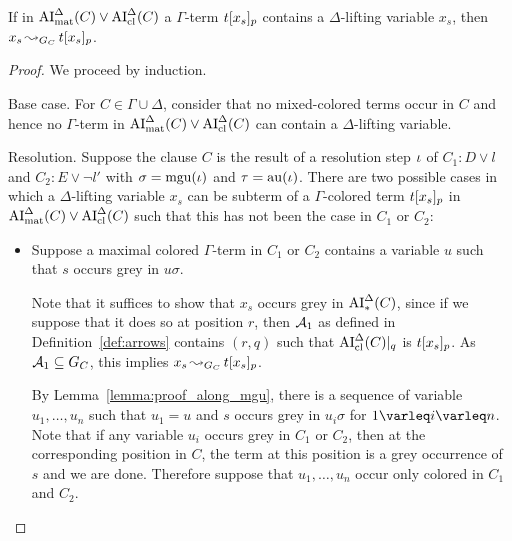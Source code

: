\documentclass[,%
	draft=false,%
	numbers=noendperiod
	11pt,
	a4paper,
	oneside,%
	openany,
]{memoir}
\begin{document}
\begin{lemma}
	If in $\operatorname{AI}_\mathrm{mat}^\Delta(C) \lor \operatorname{AI}_\mathrm{cl}^\Delta(C)$ a
	$\Gamma$-term $t{[x_s]_{p}}$ contains a $\Delta$-lifting variable $x_s$, then $x_s \operatorname{\leadsto}_{G_C} t{[x_s]_{p}}$.
\end{lemma}
\begin{proof}
	We proceed by induction.

	\begin{description}
		\item{}Base case.
			For $C \in \Gamma\cup\Delta$, consider that no mixed-colored terms occur in $C$ and hence no $\Gamma$-term in $\operatorname{AI}_\mathrm{mat}^\Delta(C) \lor \operatorname{AI}_\mathrm{cl}^\Delta(C)$ can contain a $\Delta$-lifting variable.

		\item{}Resolution.
			Suppose the clause $C$ is the result of a resolution step $\iota$ of $C_1: D \lor l$ and $C_2: E \lor \lnot l'$ with $\sigma = \operatorname{mgu}(\iota)$ and $\tau = \operatorname{au}(\iota)$.
			There are two possible cases in which a $\Delta$-lifting variable $x_s$ can be subterm of a $\Gamma$-colored term $t{[x_s]_{p}}$ in $\operatorname{AI}_\mathrm{mat}^\Delta(C)\lor \operatorname{AI}_\mathrm{cl}^\Delta(C)$ such that this has not been the case in $C_1$ or $C_2$:

			\begin{itemize}

				\item Suppose a maximal colored $\Gamma$-term in $C_1$ or $C_2$ contains a variable $u$ such that $s$ occurs grey in $u\sigma$. 

					Note that it suffices to show that $x_s$ occurs grey in $\operatorname{AI}_\mathrm{*}^\Delta(C)$,
					since if we suppose that it does so at position $r$,
					then $\operatorname{\mathcal{A}}_1$ as defined in Definition~\ref{def:arrows} contains $(r, q)$ such that $\operatorname{AI}_\mathrm{cl}^\Delta(C)|_{q}$ is $t{[x_s]_{p}}$.
					As $\operatorname{\mathcal{A}}_1 \subseteq G_C$, this implies $x_s \operatorname{\leadsto}_{G_C} t{[x_s]_{p}}$.

					By Lemma~\ref{lemma:proof_along_mgu}, there is a sequence of variable $u_1, \dots, u_n$ such that $u_1 = u$ and $s$ occurs grey in $u_i \sigma$ for $1\varleq i \varleq n$. 
					Note that if any variable $u_i$ occurs grey in $C_1$ or $C_2$, then at the corresponding position in $C$, the term at this position is a grey occurrence of $s$ and we are done.
					Therefore suppose that $u_1, \dots, u_n$ occur only colored in $C_1$ and $C_2$.

					\begin{comment}

						alternate version (unfinished)


\end{comment}
\end{itemize}
\end{description}
\end{proof}
\end{document}

